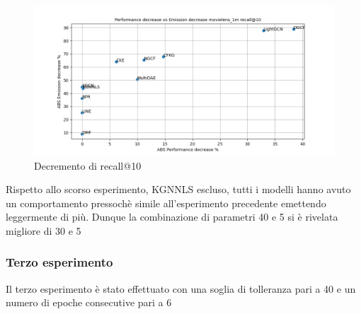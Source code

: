 \begin{figure}[H]
    \centering
    \includegraphics[scale=0.5]{images/decrement_recall@10_movielens_1m_30_5.png}
    \caption{Decremento di recall@10}
\end{figure}
\noindent Rispetto allo scorso esperimento, KGNNLS escluso, tutti i modelli hanno avuto un comportamento pressochè simile all'esperimento precedente emettendo leggermente di più. Dunque la combinazione di parametri 40 e 5 si è rivelata migliore di 30 e 5

\subsubsection{Terzo esperimento}
Il terzo esperimento è stato effettuato con una soglia di tolleranza pari a 40 e un numero di epoche consecutive pari a 6



